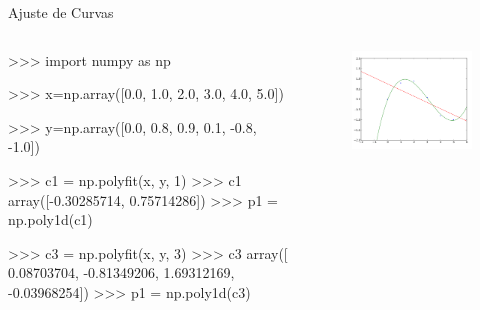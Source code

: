 \documentclass[12pt,t,graphics]{beamer}
\begin{document}
\begin{frame}[t,fragile]{Ajuste de Curvas}
	\begin{columns}
		\vspace{-0.3cm}
		\begin{python}
		>>> import numpy as np
		
		>>> x=np.array([0.0, 1.0, 2.0, 
		3.0, 4.0, 5.0]) 
		
		>>> y=np.array([0.0, 0.8, 0.9,
		0.1, -0.8, -1.0]) 
		
		>>> c1 = np.polyfit(x, y, 1) 
		>>> c1
		array([-0.30285714,  0.75714286])
		>>> p1 = np.poly1d(c1) 
		
		>>> c3 = np.polyfit(x, y, 3) 
		>>> c3
		array([ 0.08703704, -0.81349206, 
		1.69312169, -0.03968254])
		>>> p1 = np.poly1d(c3) 
		
		\end{python}
		\vspace{-1cm}
		\begin{figure}
			\centering
			\includegraphics[scale=0.4]{img/ac_deg1deg3.png}
		\end{figure}
	\end{columns}
\end{frame}
\end{document}
